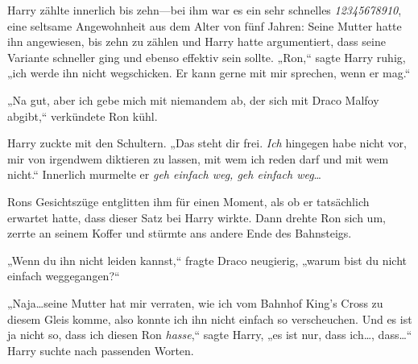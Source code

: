 Harry zählte innerlich bis zehn—bei ihm war es ein sehr schnelles \emph{12345678910}, eine seltsame Angewohnheit aus dem Alter von fünf Jahren: Seine Mutter hatte ihn angewiesen, bis zehn zu zählen und Harry hatte argumentiert, dass seine Variante schneller ging und ebenso effektiv sein sollte. „Ron,“ sagte Harry ruhig, „ich werde ihn nicht wegschicken. Er kann gerne mit mir sprechen, wenn er mag.“

„Na gut, aber ich gebe mich mit niemandem ab, der sich mit Draco Malfoy abgibt,“ verkündete Ron kühl.

Harry zuckte mit den Schultern. „Das steht dir frei. \emph{Ich} hingegen habe nicht vor, mir von irgendwem diktieren zu lassen, mit wem ich reden darf und mit wem nicht.“ Innerlich murmelte er \emph{geh einfach weg, geh einfach weg}…

Rons Gesichtszüge entglitten ihm für einen Moment, als ob er tatsächlich erwartet hatte, dass dieser Satz bei Harry wirkte. Dann drehte Ron sich um, zerrte an seinem Koffer und stürmte ans andere Ende des Bahnsteigs.

„Wenn du ihn nicht leiden kannst,“ fragte Draco neugierig, „warum bist du nicht einfach weggegangen?“

„Naja…seine Mutter hat mir verraten, wie ich vom Bahnhof King’s Cross zu diesem Gleis komme, also konnte ich ihn nicht einfach so verscheuchen. Und es ist ja nicht so, dass ich diesen Ron \emph{hasse},“ sagte Harry, „es ist nur, dass ich…, dass…“ Harry suchte nach passenden Worten.

